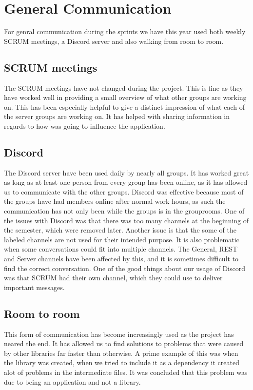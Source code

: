 \section{General Communication}
For genral communication during the sprints we have this year used both weekly
SCRUM meetings, a Discord server and also walking from room to room.

\subsection{SCRUM meetings}
The SCRUM meetings have not changed during the project. This is fine as they
have worked well in providing a small overview of what other groups are working
on. This has been especially helpful to give a distinct impression of what each
of the server groups are working on. It has helped with sharing information in
regards to how  was going to influence the application.

\subsection{Discord}
The Discord server have been used daily by nearly all groups. It has worked
great as long as at least one person from every group has been online, as it
has allowed us to communicate with the other groups. Discord was effective
because most of the groups have had members online after normal work hours, as
such the communication has not only been while the groups is in the grouprooms.
One of the issues with Discord was that there was too many channels at the
beginning of the semester, which were removed later. Another issue is that the
some of the labeled channels are not used for their intended purpose. It is
also problematic when some conversations could fit into multiple channels. The
General, REST and Server channels have been affected by this, and it is
sometimes difficult to find the correct conversation. One of the good things
about our usage of Discord was that SCRUM had their own channel, which they
could use to deliver important messages.

\subsection{Room to room}
This form of communication has become increasingly used as the project has
neared the end. It has allowed us to find solutions to problems that were caused by
other libraries far faster than otherwise. A prime example of this was when the
 library was created, when we tried to include it as
a dependency it created alot of problems in the intermediate files. It was
concluded that this problem was due to  being an
application and not a library.
